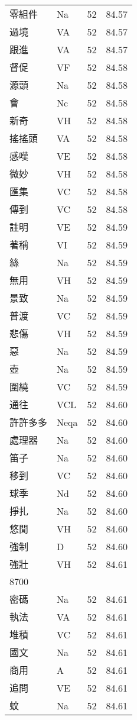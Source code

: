\documentclass[twocolumn]{book}
\begin{document}
\begin{supertabular}{llrr}
零組件 & Na & 52 &  84.57\\
過境 & VA & 52 &  84.57\\
跟進 & VA & 52 &  84.57\\
督促 & VF & 52 &  84.58\\
源頭 & Na & 52 &  84.58\\
會 & Nc & 52 &  84.58\\
新奇 & VH & 52 &  84.58\\
搖搖頭 & VA & 52 &  84.58\\
感嘆 & VE & 52 &  84.58\\
微妙 & VH & 52 &  84.58\\
匯集 & VC & 52 &  84.58\\
傳到 & VC & 52 &  84.58\\
註明 & VE & 52 &  84.59\\
著稱 & VI & 52 &  84.59\\
絲 & Na & 52 &  84.59\\
無用 & VH & 52 &  84.59\\
景致 & Na & 52 &  84.59\\
普渡 & VC & 52 &  84.59\\
悲傷 & VH & 52 &  84.59\\
惡 & Na & 52 &  84.59\\
壺 & Na & 52 &  84.59\\
圍繞 & VC & 52 &  84.59\\
通往 & VCL & 52 &  84.60\\
許許多多 & Neqa & 52 &  84.60\\
處理器 & Na & 52 &  84.60\\
笛子 & Na & 52 &  84.60\\
移到 & VC & 52 &  84.60\\
球季 & Nd & 52 &  84.60\\
掙扎 & Na & 52 &  84.60\\
悠閒 & VH & 52 &  84.60\\
強制 & D & 52 &  84.60\\
強壯 & VH & 52 &  84.61\\
8700\\
密碼 & Na & 52 &  84.61\\
執法 & VA & 52 &  84.61\\
堆積 & VC & 52 &  84.61\\
國文 & Na & 52 &  84.61\\
商用 & A & 52 &  84.61\\
追問 & VE & 52 &  84.61\\
蚊 & Na & 52 &  84.61\\

\end{supertabular}
\end{document}

